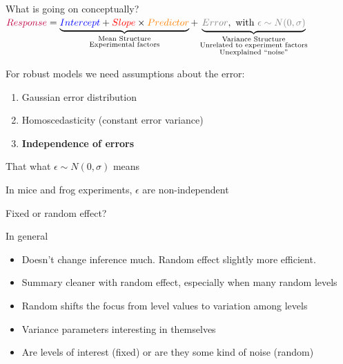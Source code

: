 \documentclass{beamer}
\begin{document}
\begin{frame}{What is going on conceptually?}
 $
{\color{purple}{Response}} = \underbrace{{\color{blue}{Intercept}} + {\color{red}{Slope}} \times {\color{orange}{Predictor}}}_{\substack{\text{Mean Structure} \\ \text{Experimental factors}}} + \underbrace{{\color{gray}{Error}}, \text{ with } {\color{gray}{\epsilon \sim N(0,\sigma)}}}_{\substack{\text{Variance Structure} \\ \text{Unrelated to experiment factors} \\ \text{Unexplained ``noise''}}}
$
\pause

\begin{alertblock}{For robust models we need assumptions about the error:}
 \begin{enumerate}
  \item Gaussian error distribution
  \item Homoscedasticity (constant error variance)
  \item \textbf{Independence of errors}
 \end{enumerate}
 
 That what $\epsilon \sim N(0,\sigma)$ means
\end{alertblock}

\pause

In mice and frog experiments, $\epsilon$ are non-independent

\end{frame}





\begin{frame}{Fixed or random effect?}
  
  \begin{block}{In general}
   \begin{itemize}
    \item Doesn't change inference much. Random effect slightly more efficient.
    \item Summary cleaner with random effect, especially when many random levels
    \item Random shifts the focus from level values to variation among levels
    \item Variance parameters interesting in themselves
    \item Are levels of interest (fixed) or are they some kind of noise (random)
   \end{itemize}
  \end{block}

\end{frame}
\end{document}
